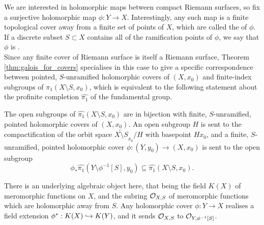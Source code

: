 We are interested in holomorphic maps between compact Riemann surfaces, so fix a surjective holomorphic map $\phi : Y \to X$. Interestingly, any such map is a finite topological cover away from a finite set of points of $X$, which are called the  of $\phi$. If a discrete subset $S \subset X$ contains all of the ramification points of $\phi$, we say that $\phi$ is . \\


Since any finite cover of Riemann surface is itself a Riemann surface, Theorem \ref{thm:galois_for_covers} specialises in this case to give a specific correspondence between pointed, $S$-unramified holomorphic covers of $(X,x_0)$ and finite-index subgroups of $\pi_1(X\setminus S, x_0)$, which is equivalent to the following statement about the profinite completion $\widehat{\pi_1}$ of the fundamental group.

\begin{thm}
	The open subgroups of $\widehat{\pi_1}(X\setminus S, x_0)$ are in bijection with finite, $S$-unramified, pointed holomorphic covers of $(X, x_0)$. An open subgroup $H$ is sent to the compactification of the orbit space $\widetilde{X \setminus S}_{x_0}/H$ with basepoint $Hx_0$, and a finite, $S$-unramified, pointed holomorphic cover $\phi : (Y, y_0) \to (X, x_0)$ is sent to the open subgroup
	\[
		\phi_* \widehat{\pi_1}(Y\setminus \phi^{-1}[S], y_0) \subseteq \widehat{\pi_1}(X\setminus S, x_0).
	\]
\end{thm}

There is an underlying algebraic object here, that being the field $K(X)$ of meromorphic functions on $X$, and the subring $\mathcal{O}_{X,S}$ of meromorphic functions which are holomorphic away from $S$. Any holomorphic cover $\phi : Y \to X$  realises a field extension $\phi^* : K(X) \hookrightarrow K(Y)$, and it sends $\mathcal{O}_{X, S}$ to $\mathcal{O}_{Y, \phi^{-1}[S]}$.


